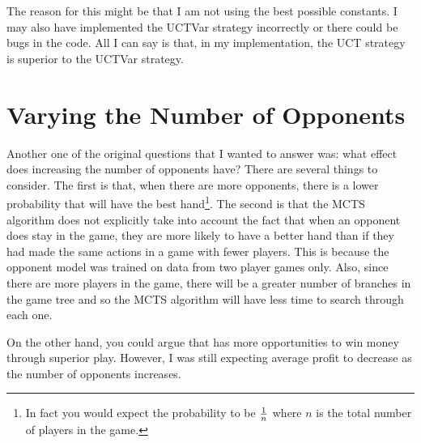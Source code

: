 The reason for this might be that I am not using the best possible constants. I may also have implemented the UCTVar strategy incorrectly or there could be bugs in the code. All I can say is that, in my implementation, the UCT strategy is superior to the UCTVar strategy.



\section{Varying the Number of Opponents}		%

Another one of the original questions that I wanted to answer was: what effect does increasing the number of opponents have? 
There are several things to consider.
The first is that, when there are more opponents, there is a lower probability that \mbt will have the best hand\footnote{In fact you would expect the probability to be \(1 \over n\) where \(n\) is the total number of players in the game.}. The second is that the MCTS algorithm does not explicitly take into account the fact that when an opponent does stay in the game, they are more likely to have a better hand than if they had made the same actions in a game with fewer players. This is because the opponent model was trained on data from two player games only. Also, since there are more players in the game, there will be a greater number of branches in the game tree and so the MCTS algorithm will have less time to search through each one. 

On the other hand, you could argue that \mbt has more opportunities to win money through superior play. However, I was still expecting \mbts average profit to decrease as the number of opponents increases. 

